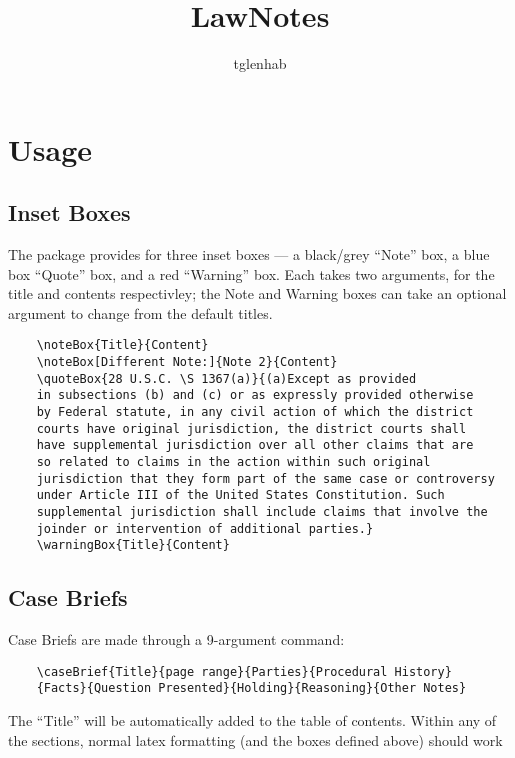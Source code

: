 \documentclass{article}
\title{LawNotes}
\author{tglenhab}
\date{\vspace{-5ex}}
\begin{document}
\maketitle

\section{Usage}
\subsection{Inset Boxes}

The package provides for three inset boxes --- a black/grey ``Note'' box, a blue box ``Quote'' box, and a red ``Warning'' box. Each takes two arguments, for the title and contents respectivley; the Note and Warning boxes can take an optional argument to change from the default titles.

\begin{verbatim}
    \noteBox{Title}{Content}
    \noteBox[Different Note:]{Note 2}{Content}
    \quoteBox{28 U.S.C. \S 1367(a)}{(a)Except as provided 
    in subsections (b) and (c) or as expressly provided otherwise 
    by Federal statute, in any civil action of which the district
    courts have original jurisdiction, the district courts shall
    have supplemental jurisdiction over all other claims that are
    so related to claims in the action within such original
    jurisdiction that they form part of the same case or controversy
    under Article III of the United States Constitution. Such
    supplemental jurisdiction shall include claims that involve the
    joinder or intervention of additional parties.}
    \warningBox{Title}{Content}
\end{verbatim}


\subsection{Case Briefs}

Case Briefs are made through a 9-argument command:

\begin{verbatim}
    \caseBrief{Title}{page range}{Parties}{Procedural History}
    {Facts}{Question Presented}{Holding}{Reasoning}{Other Notes}
\end{verbatim}

\noindent The ``Title'' will be automatically added to the table of contents. Within any of the sections, normal latex formatting (and the boxes defined above) should work
\end{document}
